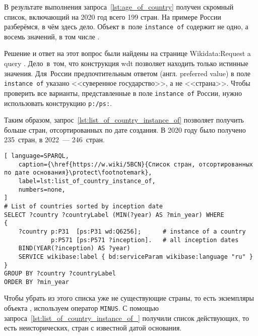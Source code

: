 В результате выполнения запроса~\ref{lst:age_of_country} 
получен скромный список, включающий на 2020 год всего 199 стран. 
На примере России разберёмся, в чём здесь дело. 
Объект  в~поле \mbox{\lstinline|instance of|} содержит не одно, а восемь значений, в том числе .

Решение и ответ на этот вопрос были найдены на странице Wikidata:Request a query%
. Дело~в~том, что конструкция wdt позволяет находить только истинные значения. 
Для~России предпочтительным ответом (англ. preferred value) 
в поле \lstinline|instance of| указано <<суверенное государство>>, а не <<страна>>. 
Чтобы проверить все варианты, представленные в поле \lstinline|instance of| России, 
нужно использовать конструкцию \lstinline|p:/ps:|.

Таким образом, запрос~\ref{lst:list_of_country_instance_of} 
позволяет получить больше стран, отсортированных по дате создания. 
В 2020 году было получено 235~стран, в 2022~--- 246~стран.


\newpage
\begin{lstlisting}[ language=SPARQL, 
    caption={\href{https://w.wiki/5BCN}{Список стран, отсортированных по дате основания}\protect\footnotemark},
    label=lst:list_of_country_instance_of, 
    numbers=none,
]
# List of countries sorted by inception date
SELECT ?country ?countryLabel (MIN(?year) AS ?min_year) WHERE
{
    ?country p:P31  [ps:P31 wd:Q6256];      # instance of a country 
             p:P571 [ps:P571 ?inception].   # all inception dates
    BIND(YEAR(?inception) AS ?year)
    SERVICE wikibase:label { bd:serviceParam wikibase:language "ru" }
}
GROUP BY ?country ?countryLabel
ORDER BY ?min_year
\end{lstlisting}

Чтобы убрать из этого списка уже не существующие страны, 
то есть экземпляры объекта , 
используем оператор \lstinline|MINUS|. 
С помощью запроса~\ref{lst:list_of_country_instance_of_} получили список действующих, 
то есть неисторических, стран с известной датой основания.

